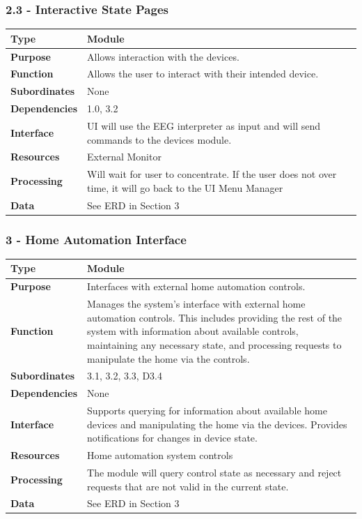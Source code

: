 \documentclass{article}
\begin{document}
\subsubsection*{2.3 - Interactive State Pages}
\begin{tabular}{ | l |  p{13.3cm} |}
\hline
\textbf{Type} & Module \\ \hline
\textbf{Purpose} & Allows interaction with the devices. \\ \hline
\textbf{Function} & Allows the user to interact with their intended device. \\ \hline
\textbf{Subordinates} & None \\ \hline
\textbf{Dependencies} & 1.0, 3.2 \\ \hline
\textbf{Interface} & UI will use the EEG interpreter as input and will send commands to the devices module.  \\ \hline
\textbf{Resources} & External Monitor \\ \hline
\textbf{Processing} & Will wait for user to concentrate. If the user does not over time, it will go back to the UI Menu Manager \\ \hline
\textbf{Data} & See ERD in Section 3 \\ \hline
\end{tabular}

\subsubsection*{3 - Home Automation Interface}
\begin{tabular}{ | l |  p{13.3cm} |}
\hline
\textbf{Type} & Module \\ \hline
\textbf{Purpose} & Interfaces with external home automation controls. \\ \hline
\textbf{Function} & Manages the system's interface with external home
automation controls. This includes providing the rest of the system with
information about available controls, maintaining any necessary state, and
processing requests to manipulate the home via the controls. \\ \hline
\textbf{Subordinates} & 3.1, 3.2, 3.3, D3.4 \\ \hline
\textbf{Dependencies} & None \\ \hline
\textbf{Interface} & Supports querying for information about available home
devices and manipulating the home via the devices. Provides notifications for
changes in device state. \\ \hline
\textbf{Resources} & Home automation system controls \\ \hline
\textbf{Processing} & The module will query control state as necessary and
reject requests that are not valid in the current state. \\ \hline
\textbf{Data} & See ERD in Section 3 \\ \hline
\end{tabular}
\end{document}
